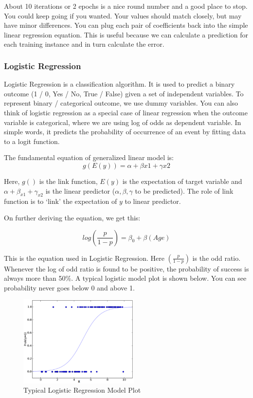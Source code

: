 \documentclass[conference,compsoc]{IEEEtran}
\begin{document}
About 10 iterations or 2 epochs is a nice round number and a good place to stop. You could keep going if you wanted. Your values should match closely, but may have minor differences. You can plug each pair of coefficients back into the simple linear regression equation. This is useful because we can calculate a prediction for each training instance and in turn calculate the error.

\subsubsection{Logistic Regression}

Logistic Regression is a classification algorithm. It is used to predict a binary outcome (1 / 0, Yes / No, True / False) given a set of independent variables. To represent binary / categorical outcome, we use dummy variables. You can also think of logistic regression as a special case of linear regression when the outcome variable is categorical, where we are using log of odds as dependent variable. In simple words, it predicts the probability of occurrence of an event by fitting data to a logit function.

The fundamental equation of generalized linear model is:
\[
    g(E(y)) = α + βx1 + γx2    
\]

Here, $g()$ is the link function, $E(y)$ is the expectation of target variable and $α + β_{x1} + γ_{x2}$ is the linear predictor ($α, β, γ$ to be predicted). The role of link function is to ‘link’ the expectation of $y$ to linear predictor.

On further deriving the equation, we get this:

\[
    log(\frac{p}{1 - p}) = \beta_{0} + \beta(Age)
\]

This is the equation used in Logistic Regression. Here $(\frac{p}{1-p})$ is the odd ratio. Whenever the log of odd ratio is found to be positive, the probability of success is always more than 50\%. A typical logistic model plot is shown below. You can see probability never goes below 0 and above 1.

\begin{figure}[H]
    \centering
    \includegraphics[width=6cm]{images/logistic-regression-plot.png}
    \caption{Typical Logistic Regression Model Plot}
\end{figure}
\end{document}
